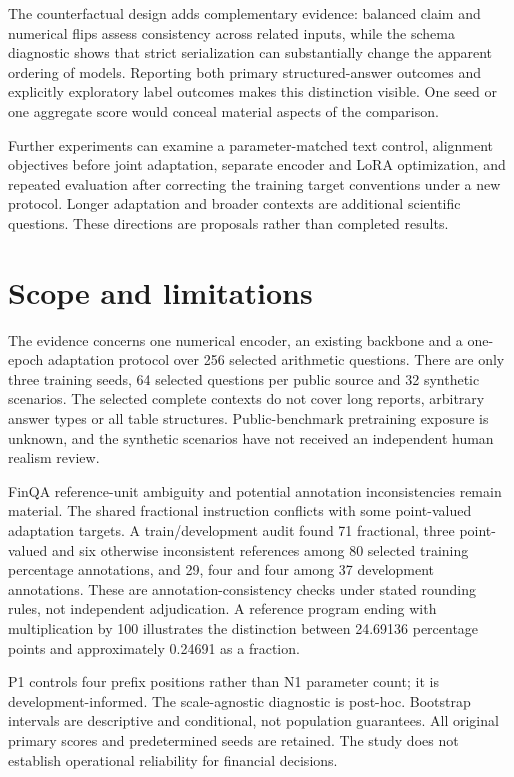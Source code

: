 \documentclass[11pt,a4paper]{article}
\begin{document}
The counterfactual design adds complementary evidence: balanced claim and numerical flips assess consistency across related inputs, while the schema diagnostic shows that strict serialization can substantially change the apparent ordering of models. Reporting both primary structured-answer outcomes and explicitly exploratory label outcomes makes this distinction visible. One seed or one aggregate score would conceal material aspects of the comparison.

Further experiments can examine a parameter-matched text control, alignment objectives before joint adaptation, separate encoder and LoRA optimization, and repeated evaluation after correcting the training target conventions under a new protocol. Longer adaptation and broader contexts are additional scientific questions. These directions are proposals rather than completed results.

\section{Scope and limitations}
The evidence concerns one numerical encoder, an existing backbone and a one-epoch adaptation protocol over 256 selected arithmetic questions. There are only three training seeds, 64 selected questions per public source and 32 synthetic scenarios. The selected complete contexts do not cover long reports, arbitrary answer types or all table structures. Public-benchmark pretraining exposure is unknown, and the synthetic scenarios have not received an independent human realism review.

FinQA reference-unit ambiguity and potential annotation inconsistencies remain material. The shared fractional instruction conflicts with some point-valued adaptation targets. A train/development audit found 71 fractional, three point-valued and six otherwise inconsistent references among 80 selected training percentage annotations, and 29, four and four among 37 development annotations. These are annotation-consistency checks under stated rounding rules, not independent adjudication. A reference program ending with multiplication by 100 illustrates the distinction between 24.69136 percentage points and approximately 0.24691 as a fraction.

P1 controls four prefix positions rather than N1 parameter count; it is development-informed. The scale-agnostic diagnostic is post-hoc. Bootstrap intervals are descriptive and conditional, not population guarantees. All original primary scores and predetermined seeds are retained. The study does not establish operational reliability for financial decisions.
\end{document}
